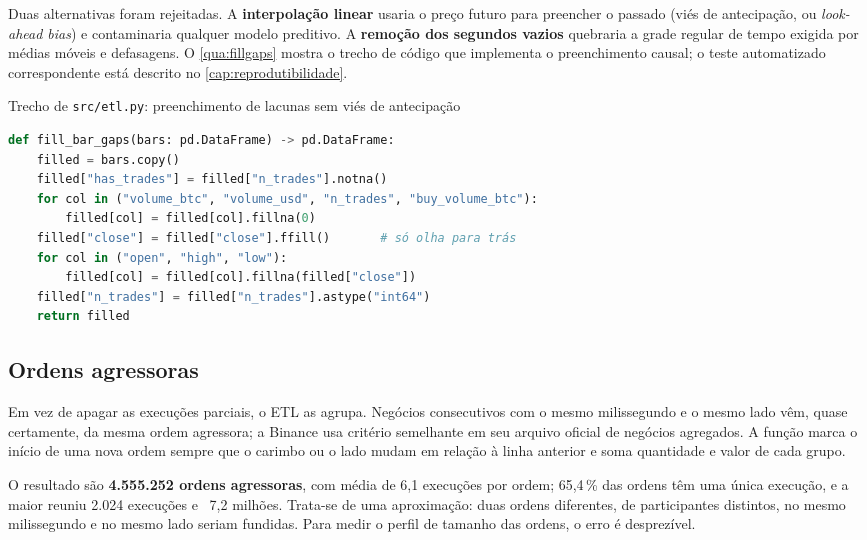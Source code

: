 Duas alternativas foram rejeitadas. A \textbf{interpolação linear} usaria o
preço futuro para preencher o passado (viés de antecipação, ou
\textit{look-ahead bias}) e contaminaria qualquer modelo preditivo. A
\textbf{remoção dos segundos vazios} quebraria a grade regular de tempo exigida
por médias móveis e defasagens. O \autoref{qua:fillgaps} mostra o trecho de
código que implementa o preenchimento causal; o teste automatizado
correspondente está descrito no \autoref{cap:reprodutibilidade}.

\begin{quadro}[htbp]
\caption{\label{qua:fillgaps}Trecho de \texttt{src/etl.py}: preenchimento de lacunas sem viés de antecipação}
\begin{minipage}{\textwidth}
\SingleSpacing
\begin{lstlisting}[language=Python]
def fill_bar_gaps(bars: pd.DataFrame) -> pd.DataFrame:
    filled = bars.copy()
    filled["has_trades"] = filled["n_trades"].notna()
    for col in ("volume_btc", "volume_usd", "n_trades", "buy_volume_btc"):
        filled[col] = filled[col].fillna(0)
    filled["close"] = filled["close"].ffill()       # só olha para trás
    for col in ("open", "high", "low"):
        filled[col] = filled[col].fillna(filled["close"])
    filled["n_trades"] = filled["n_trades"].astype("int64")
    return filled
\end{lstlisting}
\end{minipage}
\end{quadro}

\subsection{Ordens agressoras}\label{sec:ordens}

Em vez de apagar as execuções parciais, o ETL as agrupa. Negócios consecutivos
com o mesmo milissegundo e o mesmo lado vêm, quase certamente, da mesma ordem
agressora; a Binance usa critério semelhante em seu arquivo oficial de negócios
agregados. A função  marca o início de uma nova ordem
sempre que o carimbo ou o lado mudam em relação à linha anterior e soma
quantidade e valor de cada grupo.

O resultado são \textbf{4.555.252 ordens agressoras}, com média de 6,1
execuções por ordem; 65,4\,\% das ordens têm uma única execução, e a maior
reuniu 2.024 execuções e \usd~7,2 milhões. Trata-se de uma aproximação: duas
ordens diferentes, de participantes distintos, no mesmo milissegundo e no mesmo
lado seriam fundidas. Para medir o perfil de tamanho das ordens, o erro é
desprezível.

